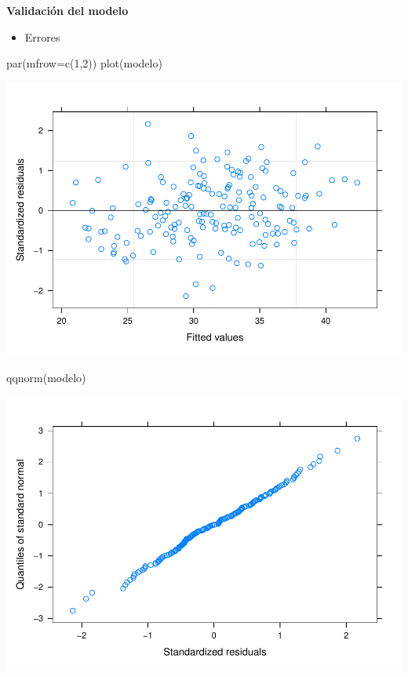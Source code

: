 \documentclass[
]{book}
\newenvironment{Shaded}{\begin{snugshade}}{\end{snugshade}}
\newcommand{\AttributeTok}[1]{\textcolor[rgb]{0.77,0.63,0.00}{#1}}
\newcommand{\DecValTok}[1]{\textcolor[rgb]{0.00,0.00,0.81}{#1}}
\newcommand{\FunctionTok}[1]{\textcolor[rgb]{0.00,0.00,0.00}{#1}}
\newcommand{\NormalTok}[1]{#1}
\providecommand{\tightlist}{%
  \setlength{\itemsep}{0pt}\setlength{\parskip}{0pt}}
\begin{document}
\textbf{Validación del modelo}

\begin{itemize}
\tightlist
\item
  Errores
\end{itemize}

\begin{Shaded}
\begin{Highlighting}[]
\FunctionTok{par}\NormalTok{(}\AttributeTok{mfrow=}\FunctionTok{c}\NormalTok{(}\DecValTok{1}\NormalTok{,}\DecValTok{2}\NormalTok{))}
\FunctionTok{plot}\NormalTok{(modelo)}
\end{Highlighting}
\end{Shaded}

\includegraphics{fig_out/unnamed-chunk-129-1.pdf}

\begin{Shaded}
\begin{Highlighting}[]
\FunctionTok{qqnorm}\NormalTok{(modelo)}
\end{Highlighting}
\end{Shaded}

\includegraphics{fig_out/unnamed-chunk-129-2.pdf}
\end{document}
